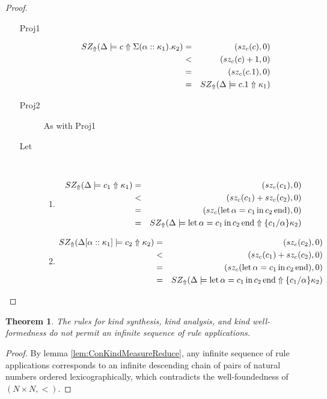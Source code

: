 \documentclass[12pt,twoside,fleqn]{amsart}
\theoremstyle{plain}
\newtheorem{thm}{Theorem}
\theoremstyle{plain}
\theoremstyle{definition}
\begin{document}
\begin{proof}
\begin{itemize}
\begin{description}
\begin{enumerate}
\end{enumerate}
\item [Proj1]
\begin{eqnarray*}
SZ_{\Uparrow }(\Delta  \models c \Uparrow \Sigma (\alpha ::\kappa _{1}).\kappa _{2} ) & = & (sz_{c}(c ),0)\\
 & < & (sz_{c}(c )+1,0)\\
 & = & (sz_{c}(c.1 ),0)\\
 & = & SZ_{\Uparrow }(\Delta  \models c.1 \Uparrow \kappa _{1} )
\end{eqnarray*}

\item [Proj2]As with Proj1
\item [Let]~

\begin{enumerate}
\item 
\begin{eqnarray*}
SZ_{\Uparrow }(\Delta  \models c_{1} \Uparrow \kappa _{1} ) & = & (sz_{c}(c_{1} ),0)\\
 & < & (sz_{c}(c_{1} )+sz_{c}(c_{2} ),0)\\
 & = & (sz_{c}(\mathrm{let}\, \alpha  =c_{1} \, \mathrm{in}\, c_{2} \, \mathrm{end} ),0)\\
 & = & SZ_{\Uparrow }(\Delta  \models \mathrm{let}\, \alpha  =c_{1} \, \mathrm{in}\, c_{2} \, \mathrm{end} \Uparrow \{c_{1} /\alpha  \}\kappa _{2} )
\end{eqnarray*}

\item 
\begin{eqnarray*}
SZ_{\Uparrow }(\Delta [\alpha ::\kappa _{1}] \models c_{2} \Uparrow \kappa _{2} ) & = & (sz_{c}(c_{2} ),0)\\
 & < & (sz_{c}(c_{1} )+sz_{c}(c_{2} ),0)\\
 & = & (sz_{c}(\mathrm{let}\, \alpha  =c_{1} \, \mathrm{in}\, c_{2} \, \mathrm{end} ),0)\\
 & = & SZ_{\Uparrow }(\Delta  \models \mathrm{let}\, \alpha  =c_{1} \, \mathrm{in}\, c_{2} \, \mathrm{end} \Uparrow \{c_{1} /\alpha  \}\kappa _{2} )
\end{eqnarray*}

\end{enumerate}
\end{description}
\end{itemize}
\end{proof}
\begin{thm}
The rules for kind synthesis, kind analysis, and kind well-formedness do not
permit an infinite sequence of rule applications.
\end{thm}
\begin{proof}
By lemma \ref{lem:ConKindMeasureReduce}, any infinite sequence of rule applications
corresponds to an infinite descending chain of pairs of natural numbers ordered
lexicographically, which contradicts the well-foundedness of \( (N\times N,<) \). 
\end{proof}
\end{document}
